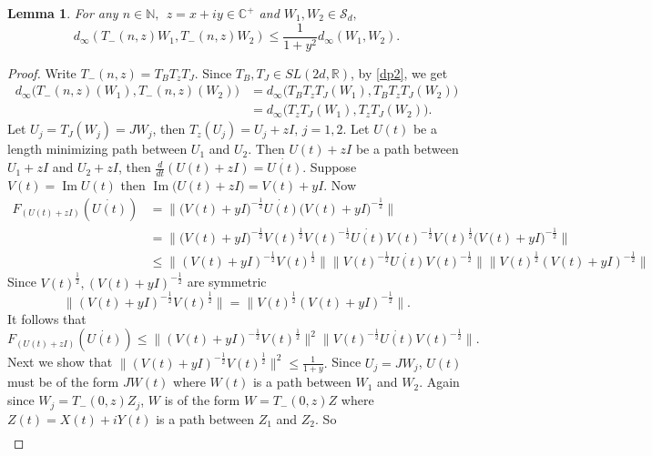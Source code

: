 \documentclass[reqno]{amsart}
\numberwithin{equation}{section}
\newcommand{\C}{\mathbb{C}}
\newcommand{\R}{\mathbb{R}}
\newcommand{\N}{\mathbb{N}}
\newtheorem{lemma}{Lemma}[section]
\begin{document}
\begin{lemma} For any $n\in \N, \ \ z =x+iy \in \C^+$ and $ W_1, W_2 \in \mathcal S_d,$
\begin{equation}\label{di}
d_{\infty}(T_-(n, z)W_1, T_-(n, z)W_2 )  \leq  \frac{1}{1+y^2}	d_{\infty}( W_1,  W_2) .\end{equation}
\end{lemma}
\begin{proof}  Write $T_{-}(n,z) =  T_B  T_z T_J$. Since $T_B,  T_J  \in SL(2d, \R) $, by \eqref{dp2}, we get 
	\begin{align} \label{2.271} \nonumber d_{\infty} \Big(T_{-}(n,z)( W_1), T_{-}(n,z)( W_2 )\Big) & = d_{\infty} \Big(T_B  T_z T_J( W_1), T_B  T_z T_J( W_2 )\Big) \\ & = d_{\infty} \Big( T_z T_J( W_1), T_z T_J( W_2 )\Big). \end{align} Let $U_j = T_J(W_j) = JW_j$, then $T_z(U_j) = U_j +zI, \, j =1,2.$  Let $U(t)$ be a length minimizing path between $U_1$ and $U_2.$ Then $U(t)+zI$ be a path between $U_1 +zI$ and  $U_2 +zI$, then $\frac{d}{dt} (U(t) +zI) = \dot{U(t)}.$ Suppose $V(t)= \operatorname{Im} U(t)$ then $\operatorname{Im}\big(U(t) +zI \big) = V(t) + yI.$ Now
\begin{align*}
F_{(U(t) +zI)} ( \dot{U(t)}) & =  \| \Big(V(t) + yI\Big)^{-\frac{1}{2}} \dot{U(t)} \Big(V(t) + yI\Big)^{-\frac{1}{2}}\| \\ & = \| \Big(V(t) + yI \Big)^{-\frac{1}{2}} V(t) ^{\frac{1}{2}}V(t)^{-\frac{1}{2}}\dot{U(t)} V(t)^{-\frac{1}{2}}V(t)^{\frac{1}{2}} \Big(V(t) + yI \Big)^{-\frac{1}{2}}\|\\ & \leq \| (V(t) + yI)^{-\frac{1}{2}} V(t)^{\frac{1}{2}} \| \| V(t)^{-\frac{1}{2}} \dot{U(t)} V(t)^{-\frac{1}{2}} \|  \| V(t)^{\frac{1}{2}} ( V(t) + yI)^{-\frac{1}{2}} \| \end{align*}
Since $ V(t)^{\frac{1}{2}}, ( V(t) + yI)^{-\frac{1}{2}}$ are symmetric $$\| (V(t) + yI)^{-\frac{1}{2}} V(t)^{\frac{1}{2}} \| = \| V(t)^{\frac{1}{2}} ( V(t) + yI)^{-\frac{1}{2}} \|.$$
It follows that 
\begin{equation} \label{eq 4.23}  F_{(U(t) +zI)} ( \dot{U(t)}) \leq \| (V(t) + yI)^{-\frac{1}{2}} V(t)^{\frac{1}{2}} \|^2 \| V(t)^{-\frac{1}{2}} \dot{U(t)} V(t)^{-\frac{1}{2}} \|  .\end{equation}
Next we show that $ \| (V(t) + yI)^{-\frac{1}{2}} V(t)^{\frac{1}{2}} \|^2 \leq \frac{1}{1+y}.$
Since $U_j = JW_j$, $U(t)$ must be of the form $JW(t)$ where $W(t)$ is a path between $W_1$ and $W_2.$ Again since $ W_j = T_- (0, z)Z_j$, $W$ is of the form $  W = T_- (0, z)Z $ where $Z(t)= X(t)+iY(t)$ is a path between $Z_1$ and $Z_2.$ So \begin{align*}

\end{align*}
\end{proof}
\end{document}

